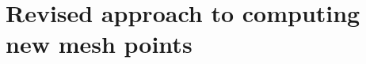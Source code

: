 \section[Revised approach to computing new mesh points]
{Revised approach to computing new mesh points}
\label{sec:revised_approach_to_computing_new_mesh_points}
